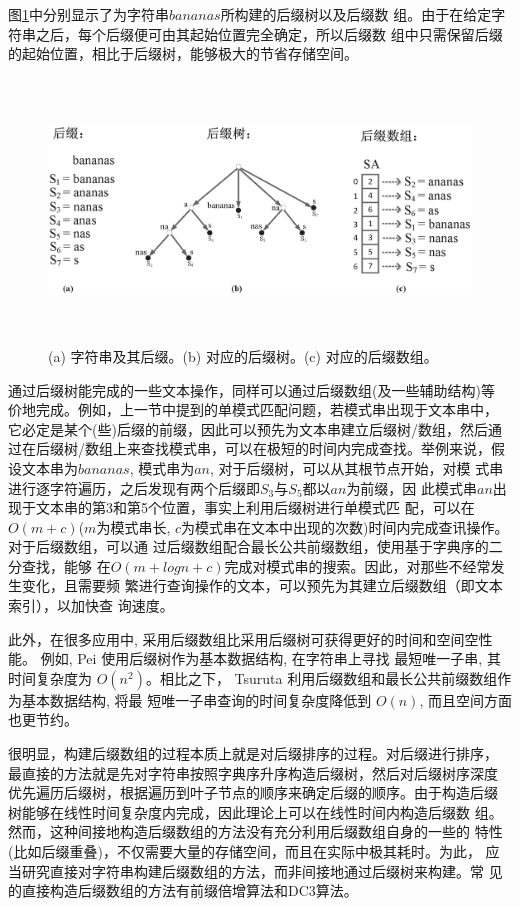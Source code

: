图\ref{fig:suffix}中分别显示了为字符串$bananas$所构建的后缀树以及后缀数
组。由于在给定字符串之后，每个后缀便可由其起始位置完全确定，所以后缀数
组中只需保留后缀的起始位置，相比于后缀树，能够极大的节省存储空间。


\begin{figure}[H]
  \centering
  \includegraphics[height=7cm ,width=15cm]{figures/1_Introduction/Suffix.eps}
  \caption{(a) 字符串及其后缀。(b) 对应的后缀树。(c) 对应的后缀数组。}
  \label{fig:suffix}
\end{figure}

通过后缀树能完成的一些文本操作，同样可以通过后缀数组(及一些辅助结构)等
价地完成。例如，上一节中提到的单模式匹配问题，若模式串出现于文本串中，
它必定是某个(些)后缀的前缀，因此可以预先为文本串建立后缀树/数组，然后通
过在后缀树/数组上来查找模式串，可以在极短的时间内完成查找。举例来说，假
设文本串为$bananas$, 模式串为$an$, 对于后缀树，可以从其根节点开始，对模
式串进行逐字符遍历，之后发现有两个后缀即$S_3$与$S_5$都以$an$为前缀，因
此模式串$an$出现于文本串的第3和第5个位置，事实上利用后缀树进行单模式匹
配，可以在$O(m+c)$($m$为模式串长,
$c$为模式串在文本中出现的次数)时间内完成查讯操作。对于后缀数组，可以通
过后缀数组配合最长公共前缀数组，使用基于字典序的二分查找，能够
在$O(m+logn+c)$完成对模式串的搜索。因此，对那些不经常发生变化，且需要频
繁进行查询操作的文本，可以预先为其建立后缀数组（即文本索引），以加快查
询速度。

此外，在很多应用中, 采用后缀数组比采用后缀树可获得更好的时间和空间空性
能。 例如, Pei\cite{Pei2013} 使用后缀树作为基本数据结构, 在字符串上寻找
最短唯一子串, 其时间复杂度为 $O(n^2)$。相比之下， Tsuruta
\cite{Tsuruta2014} 利用后缀数组和最长公共前缀数组作为基本数据结构, 将最
短唯一子串查询的时间复杂度降低到 $O(n)$, 而且空间方面也更节约。

很明显，构建后缀数组的过程本质上就是对后缀排序的过程。对后缀进行排序，
最直接的方法就是先对字符串按照字典序升序构造后缀树，然后对后缀树序深度
优先遍历后缀树，根据遍历到叶子节点的顺序来确定后缀的顺序。由于构造后缀
树能够在线性时间复杂度内完成，因此理论上可以在线性时间内构造后缀数
组。 然而，这种间接地构造后缀数组的方法没有充分利用后缀数组自身的一些的
特性(比如后缀重叠)，不仅需要大量的存储空间，而且在实际中极其耗时。为此，
应当研究直接对字符串构建后缀数组的方法，而非间接地通过后缀树来构建。常
见的直接构造后缀数组的方法有前缀倍增算法和DC3算法。

